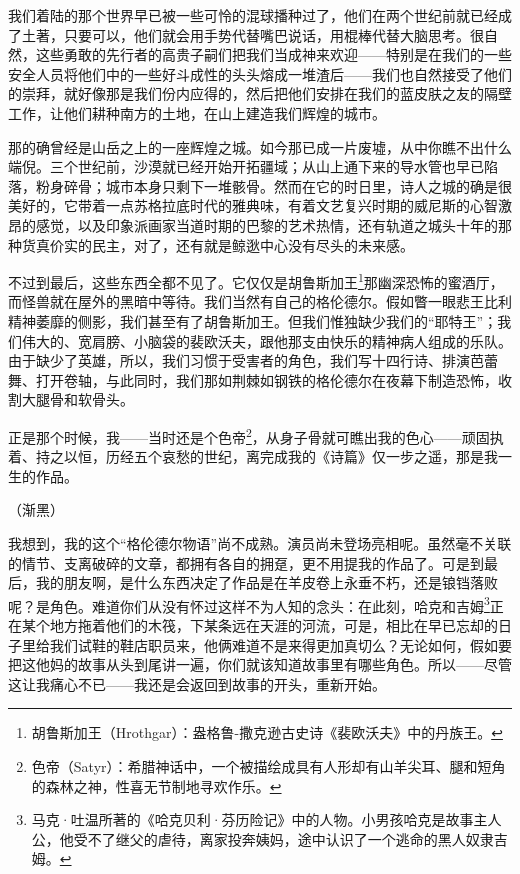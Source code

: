 \documentclass[AutoFakeBold=true]{book}
\begin{document}
我们着陆的那个世界早已被一些可怜的混球播种过了，他们在两个世纪前就已经成了土著，只要可以，他们就会用手势代替嘴巴说话，用棍棒代替大脑思考。很自然，这些勇敢的先行者的高贵子嗣们把我们当成神来欢迎——特别是在我们的一些安全人员将他们中的一些好斗成性的头头熔成一堆渣后——我们也自然接受了他们的崇拜，就好像那是我们份内应得的，然后把他们安排在我们的蓝皮肤之友的隔壁工作，让他们耕种南方的土地，在山上建造我们辉煌的城市。

那的确曾经是山岳之上的一座辉煌之城。如今那已成一片废墟，从中你瞧不出什么端倪。三个世纪前，沙漠就已经开始开拓疆域；从山上通下来的导水管也早已陷落，粉身碎骨；城市本身只剩下一堆骸骨。然而在它的时日里，诗人之城的确是很美好的，它带着一点苏格拉底时代的雅典味，有着文艺复兴时期的威尼斯的心智激昂的感觉，以及印象派画家当道时期的巴黎的艺术热情，还有轨道之城头十年的那种货真价实的民主，对了，还有就是鲸逖中心没有尽头的未来感。

不过到最后，这些东西全都不见了。它仅仅是胡鲁斯加王\footnote{胡鲁斯加王（Hrothgar）：盎格鲁-撒克逊古史诗《裴欧沃夫》中的丹族王。}那幽深恐怖的蜜酒厅，而怪兽就在屋外的黑暗中等待。我们当然有自己的格伦德尔。假如瞥一眼悲王比利精神萎靡的侧影，我们甚至有了胡鲁斯加王。但我们惟独缺少我们的``耶特王''；我们伟大的、宽肩膀、小脑袋的裴欧沃夫，跟他那支由快乐的精神病人组成的乐队。由于缺少了英雄，所以，我们习惯于受害者的角色，我们写十四行诗、排演芭蕾舞、打开卷轴，与此同时，我们那如荆棘如钢铁的格伦德尔在夜幕下制造恐怖，收割大腿骨和软骨头。

正是那个时候，我——当时还是个色帝\footnote{色帝（Satyr）：希腊神话中，一个被描绘成具有人形却有山羊尖耳、腿和短角的森林之神，性喜无节制地寻欢作乐。}，从身子骨就可瞧出我的色心——顽固执着、持之以恒，历经五个哀愁的世纪，离完成我的《诗篇》仅一步之遥，那是我一生的作品。

（渐黑）

我想到，我的这个``格伦德尔物语''尚不成熟。演员尚未登场亮相呢。虽然毫不关联的情节、支离破碎的文章，都拥有各自的拥趸，更不用提我的作品了。可是到最后，我的朋友啊，是什么东西决定了作品是在羊皮卷上永垂不朽，还是锒铛落败呢？是角色。难道你们从没有怀过这样不为人知的念头：在此刻，哈克和吉姆\footnote{马克·吐温所著的《哈克贝利·芬历险记》中的人物。小男孩哈克是故事主人公，他受不了继父的虐待，离家投奔姨妈，途中认识了一个逃命的黑人奴隶吉姆。}正在某个地方拖着他们的木筏，下某条远在天涯的河流，可是，相比在早已忘却的日子里给我们试鞋的鞋店职员来，他俩难道不是来得更加真切么？无论如何，假如要把这他妈的故事从头到尾讲一遍，你们就该知道故事里有哪些角色。所以——尽管这让我痛心不已——我还是会返回到故事的开头，重新开始。

\vspace*{1em}
\end{document}
